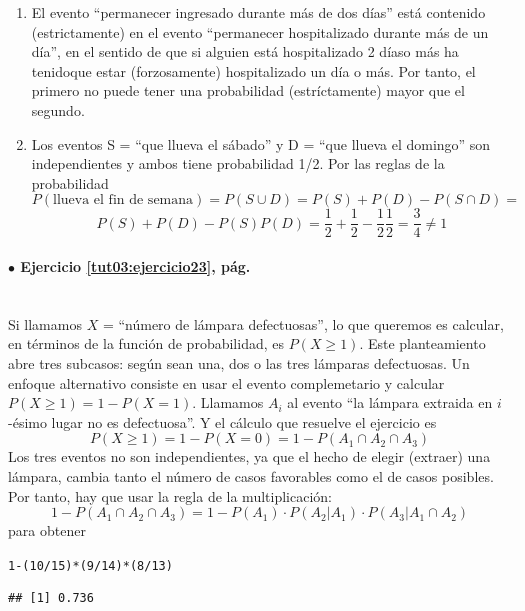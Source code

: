 \documentclass[10pt,a4paper]{article}\usepackage[]{graphicx}\usepackage[]{color}
\makeatletter
\newcommand{\hlnum}[1]{\textcolor[rgb]{0.686,0.059,0.569}{#1}}%
\newcommand{\hlopt}[1]{\textcolor[rgb]{0,0,0}{#1}}%
\newcommand{\hlstd}[1]{\textcolor[rgb]{0.345,0.345,0.345}{#1}}%
\newenvironment{kframe}{%
 \def\at@end@of@kframe{}%
 \ifinner\ifhmode%
  \def\at@end@of@kframe{\end{minipage}}%
  \begin{minipage}{\columnwidth}%
 \fi\fi%
 \def\FrameCommand##1{\hskip\@totalleftmargin \hskip-\fboxsep
 \colorbox{shadecolor}{##1}\hskip-\fboxsep
     \hskip-\linewidth \hskip-\@totalleftmargin \hskip\columnwidth}%
 \MakeFramed {\advance\hsize-\width
   \@totalleftmargin\z@ \linewidth\hsize
   \@setminipage}}%
 {\par\unskip\endMakeFramed%
 \at@end@of@kframe}
\newenvironment{knitrout}{}{} %
\newcounter {cont01}
\makeatother
\begin{document}
\begin{enumerate}
\item El evento ``permanecer ingresado durante m\'as de dos d\'ias'' está contenido (estrictamente) en el evento ``permanecer  hospitalizado durante m\'as de un d\'ia'', en el sentido de que si alguien está hospitalizado 2 díaso más ha tenidoque estar (forzosamente) hospitalizado un día o más. Por tanto, el primero no puede tener una probabilidad (estríctamente) mayor que el segundo.
\item Los eventos S = ``que llueva el sábado'' y  D = ``que llueva el domingo'' son independientes y ambos tiene probabilidad 1/2. 
Por las reglas de la probabilidad 
$$P(\text{llueva el fin de semana})=P(S\cup D) =P(S)+P( D)-P(S\cap D) =$$ 
$$ P(S)+P( D)-P(S)P(D) = \frac{1}{2}+\frac{1}{2}-\frac{1}{2}\frac{1}{2}=\frac{3}{4}\neq 1$$
\end{enumerate}


\paragraph{\bf $\bullet$ Ejercicio \ref{tut03:ejercicio23}, pág. \pageref{tut03:ejercicio23}}
\label{tut03:ejercicio23:sol}\quad\\
Si llamamos $X$ = ``número de lámpara defectuosas'', lo que queremos es calcular, en términos de la función de probabilidad, es $P(X\geq 1)$. Este planteamiento abre tres subcasos: según sean  una, dos o las tres lámparas defectuosas. Un enfoque alternativo consiste en usar el evento complemetario 
y calcular $P(X\geq 1)=1-P(X=1)$. Llamamos $A_i$ al evento ``la lámpara extraida en $i$-ésimo lugar no es defectuosa''. Y el cálculo que resuelve el ejercicio es 
$$P(X\geq 1)=1-P(X=0)=1-P(A_1\cap A_2\cap A_3)$$
Los tres eventos no son independientes, ya que el hecho de elegir (extraer) una lámpara, cambia tanto el número de casos favorables como el de casos posibles. Por tanto, hay que usar la regla de la multiplicación:
$$1-P(A_1\cap A_2\cap A_3)=1-P(A_1)·P(A_2| A_1)·P(A_3|A_1\cap A_2)$$
para obtener
\begin{knitrout}
\color{fgcolor}\begin{kframe}
\begin{alltt}
\hlnum{1}\hlopt{-}\hlstd{(}\hlnum{10}\hlopt{/}\hlnum{15}\hlstd{)}\hlopt{*}\hlstd{(}\hlnum{9}\hlopt{/}\hlnum{14}\hlstd{)}\hlopt{*}\hlstd{(}\hlnum{8}\hlopt{/}\hlnum{13}\hlstd{)}
\end{alltt}
\begin{verbatim}
## [1] 0.736
\end{verbatim}
\end{kframe}
\end{knitrout}
\end{document}
